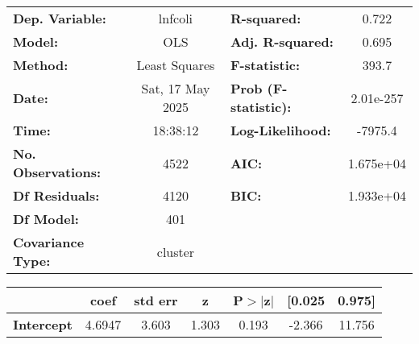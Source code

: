 \begin{center}
\begin{tabular}{lclc}
\toprule
\textbf{Dep. Variable:}                                                                             &     lnfcoli      & \textbf{  R-squared:         } &     0.722   \\
\textbf{Model:}                                                                                     &       OLS        & \textbf{  Adj. R-squared:    } &     0.695   \\
\textbf{Method:}                                                                                    &  Least Squares   & \textbf{  F-statistic:       } &     393.7   \\
\textbf{Date:}                                                                                      & Sat, 17 May 2025 & \textbf{  Prob (F-statistic):} & 2.01e-257   \\
\textbf{Time:}                                                                                      &     18:38:12     & \textbf{  Log-Likelihood:    } &   -7975.4   \\
\textbf{No. Observations:}                                                                          &        4522      & \textbf{  AIC:               } & 1.675e+04   \\
\textbf{Df Residuals:}                                                                              &        4120      & \textbf{  BIC:               } & 1.933e+04   \\
\textbf{Df Model:}                                                                                  &         401      & \textbf{                     } &             \\
\textbf{Covariance Type:}                                                                           &     cluster      & \textbf{                     } &             \\
\bottomrule
\end{tabular}
\begin{tabular}{lcccccc}
                                                                                                    & \textbf{coef} & \textbf{std err} & \textbf{z} & \textbf{P$> |$z$|$} & \textbf{[0.025} & \textbf{0.975]}  \\
\midrule
\textbf{Intercept}                                                                                  &       4.6947  &        3.603     &     1.303  &         0.193        &       -2.366    &       11.756     \\

\end{tabular}
\end{center}

